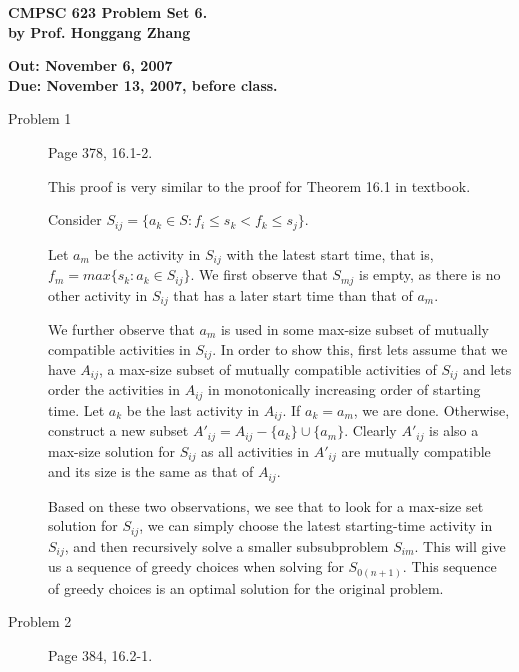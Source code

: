 \documentclass[11pt]{article}
\begin{document}

\begin{center}
{\bf CMPSC 623 Problem Set 6. } \\
{\bf by Prof. Honggang Zhang} \\
\end{center}
\begin{center}
{\bf Out: November 6, 2007} \\
{\bf Due: November 13, 2007, before class.} \\

\end{center}


\begin{description}


\item[Problem 1] Page 378, 16.1-2.

This proof is very similar to the proof for Theorem 16.1 in textbook.

Consider $S_{ij}=\{a_k \in S: f_i \le s_k < f_k \le s_j\}$.

Let $a_m$ be the activity in $S_{ij}$ with the latest start time, that is, $f_m=max\{s_k: a_k\in
S_{ij} \}$. We first observe that $S_{mj}$ is empty, as there is no other activity in $S_{ij}$ that
has a later start time than that of $a_m$.

We further observe that $a_m$ is used in some max-size subset of mutually compatible activities in
$S_{ij}$. In order to show this, first lets assume that we have $A_{ij}$, a max-size subset of
mutually compatible activities of $S_{ij}$ and lets order the activities in $A_{ij}$ in
monotonically increasing order of starting time. Let $a_k$ be the last activity in $A_{ij}$. If
$a_k=a_m$, we are done. Otherwise, construct a new subset $A'_{ij}=A_{ij}-\{a_k\}\cup \{a_m\}$.
Clearly $A'_{ij}$ is also a max-size solution for $S_{ij}$ as all activities in $A'_{ij}$ are
mutually compatible and its size is the same as that of $A_{ij}$.

Based on these two observations, we see that to look for a max-size set solution for $S_{ij}$, we
can simply choose the latest starting-time activity in $S_{ij}$, and then recursively solve a
smaller subsubproblem $S_{im}$. This will give us a sequence of greedy choices when solving for
$S_{0 (n+1)}$. This sequence of greedy choices is an optimal solution for the original problem.


\item[Problem 2] Page 384, 16.2-1.


\end{description}
\end{document}
